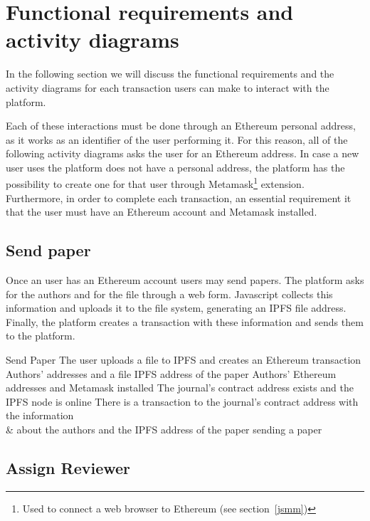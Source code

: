 \section{Functional requirements and activity diagrams}
\label{sec:funct-requ-activ}

In the following section we will discuss the functional requirements and the
activity diagrams for each transaction users can make to interact with the
platform.

Each of these interactions must be done through an Ethereum personal address, as
it works as an identifier of the user performing it. For this reason, all of the
following activity diagrams asks the user for an Ethereum address. In case a new
user uses the platform does not have a personal address, the platform has the
possibility to create one for that user through Metamask\footnote{Used to
  connect a web browser to Ethereum (see section~\ref{jsmm})} extension.
Furthermore, in order to complete each transaction, an essential requirement it
that the user must have an Ethereum account and Metamask installed.

\subsection*{Send paper}

Once an user has an Ethereum account users may send papers. The platform asks
for the authors and for the file through a web form. Javascript collects this
information and uploads it to the file system, generating an IPFS file address.
Finally, the platform creates a transaction with these information and sends
them to the platform.

{Send Paper}%
{The user uploads a file to IPFS and creates an Ethereum
  transaction}%
{Authors' addresses and a file}%
{IPFS address of the paper}%
{Authors' Ethereum addresses and Metamask installed}%
{The journal's contract address exists and the IPFS node is
  online}%
{There is a transaction to the journal's contract address with the information\\
  & about the authors and the IPFS address of the paper }%
{sending a paper}%

\subsection*{Assign Reviewer}


